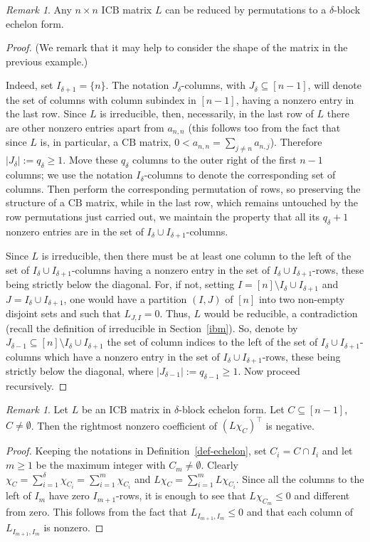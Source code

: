 \documentclass[10pt]{amsart}
\newcommand{\icb}{\mbox{$\mathrm{ICB}$}}
\newcommand{\cb}{\mbox{$\mathrm{CB}$}}
\theoremstyle{definition}
\theoremstyle{remark}
\newtheorem{remark}[cdrthm]{Remark}
\begin{document}
\begin{remark}\label{echelon-reduction}
Any $n\times n$ $\icb$ matrix $L$ can be reduced by permutations to a
$\delta$-block echelon form.
\end{remark}
\begin{proof} (We remark that it may help to consider 
the shape of the matrix in the previous example.)

Indeed, set $I_{\delta+1}=\{n\}$. The notation $J_\delta$-columns,
with $J_{\delta}\subseteq [n-1]$, will denote the set of columns with
column subindex in $[n-1]$, having a nonzero entry in the last
row. Since $L$ is irreducible, then, necessarily, in the last row of
$L$ there are other nonzero entries apart from $a_{n,n}$ (this follows
too from the fact that since $L$ is, in particular, a $\cb$ matrix,
$0<a_{n,n}=\sum_{j\neq n}a_{n,j}$). Therefore $\lvert
J_\delta\rvert:=q_\delta\geq 1$. Move these $q_\delta$ columns to the
outer right of the first $n-1$ columns; we use the notation
$I_\delta$-columns to denote the corresponding set of columns. Then
perform the corresponding permutation of rows, so preserving the
structure of a $\cb$ matrix, while in the last row, which remains
untouched by the row permutations just carried out, we maintain the
property that all its $q_\delta+1$ nonzero entries are in the set of
$I_\delta\cup I_{\delta+1}$-columns.

Since $L$ is irreducible, then there must be at least one column to
the left of the set of $I_\delta\cup I_{\delta+1}$-columns having a
nonzero entry in the set of $I_\delta\cup I_{\delta+1}$-rows, these
being strictly below the diagonal. For, if not, setting
$I=[n]\setminus I_\delta\cup I_{\delta+1}$ and $J=I_\delta\cup
I_{\delta+1}$, one would have a partition $(I,J)$ of $[n]$ into two
non-empty disjoint sets and such that $L_{J,I}=0$. Thus, $L$ would be
reducible, a contradiction (recall the definition of irreducible in
Section~\ref{ibm}). So, denote by $J_{\delta-1}\subseteq [n]\setminus
I_{\delta}\cup I_{\delta+1}$ the set of column indices to the left of
the set of $I_\delta\cup I_{\delta+1}$-columns which have a nonzero
entry in the set of $I_\delta\cup I_{\delta+1}$-rows, these being
strictly below the diagonal, where $\lvert
J_{\delta-1}\rvert:=q_{\delta-1}\geq 1$. Now proceed recursively.
\end{proof}

\begin{remark}\label{rightmost}
Let $L$ be an $\icb$ matrix in $\delta$-block echelon form. Let
$C\subseteq [n-1]$, $C\neq \emptyset$. Then the rightmost nonzero
coefficient of $(L\chi_C)^{\top}$ is negative.
\end{remark}
\begin{proof}
Keeping the notations in Definition~\ref{def-echelon}, set $C_i=C\cap
I_i$ and let $m\geq 1$ be the maximum integer with $C_m\neq
\emptyset$. Clearly
$\chi_C=\sum_{i=1}^{\delta}\chi_{C_i}=\sum_{i=1}^m\chi_{C_i}$ and
$L\chi_C=\sum_{i=1}^mL\chi_{C_i}$. Since all the columns to the left
of $I_m$ have zero $I_{m+1}$-rows, it is enough to see that
$L\chi_{C_m}\leq 0$ and different from zero. This follows from the
fact that $L_{I_{m+1},I_m}\leq 0$ and that each column of
$L_{I_{m+1},I_m}$ is nonzero.
\end{proof}
\end{document}
